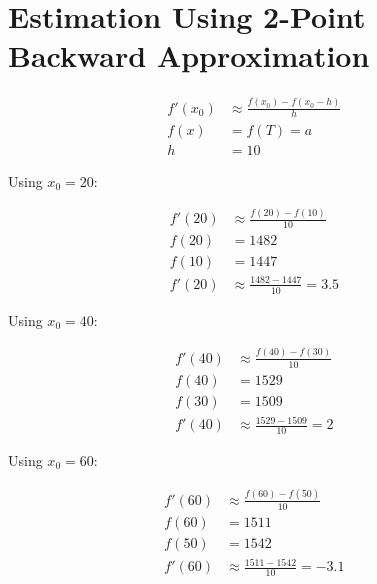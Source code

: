 \section{Estimation Using 2-Point Backward Approximation}
	\begin{align}
		f'(x_{0})&\approx \frac{f(x_{0})-f(x_{0}-h)}{h}& \\
		f(x) &= f(T) = a& \\
		h &= 10&
	\end{align}

	Using $x_{0} = 20$:

	\begin{align}
		f'(20)&\approx \frac{f(20)-f(10)}{10}& \\
		f(20) &= 1482& \\
		f(10) &= 1447& \\
		f'(20)&\approx \frac{1482-1447}{10} = 3.5&
	\end{align}

	Using $x_{0} = 40$:

	\begin{align}
		f'(40)&\approx \frac{f(40)-f(30)}{10}& \\
		f(40) &= 1529& \\
		f(30) &= 1509& \\
		f'(40)&\approx \frac{1529-1509}{10} = 2&
	\end{align}

	Using $x_{0} = 60$:

	\begin{align}
		f'(60)&\approx \frac{f(60)-f(50)}{10}& \\
		f(60) &= 1511& \\
		f(50) &= 1542& \\
		f'(60)&\approx \frac{1511-1542}{10} = -3.1&
	\end{align}
